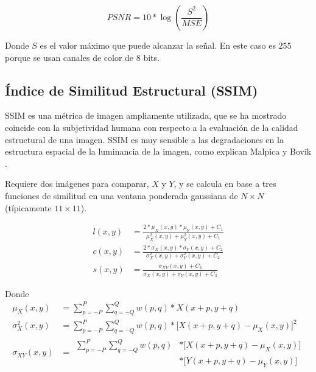 \documentclass[pregrado]{tesis-usb} %
\begin{document}
\begin{equation}\label{eq:psnr}
PSNR=10*\log\left(\frac{S^2}{MSE}\right)
\end{equation}

Donde $S$ es el valor máximo que puede alcanzar la señal. En este caso es $255$ porque se usan canales de color de 8 bits.

\subsection{Índice de Similitud Estructural (SSIM)}
SSIM es una métrica de imagen ampliamente utilizada, que se ha mostrado coincide con la subjetividad humana con respecto a la evaluación de la calidad estructural de una imagen. SSIM es muy sensible a las degradaciones en la estructura espacial de la luminancia de la imagen, como explican Malpica y Bovik \cite{Malpica2009}. 

Requiere dos imágenes para comparar, $X$ y $Y$, y se calcula en base a tres funciones de similitud en una ventana ponderada gaussiana de $N\times N$ (típicamente $11\times 11$).

\begin{equation}\label{eq:ssim_components}
\begin{split}
l(x,y) & = \frac{2*\mu_X(x,y)*\mu_Y(x,y)+C_1}{\mu_X^2(x,y)+\mu_Y^2(x,y)+C_1} \\ 
c(x,y) & = \frac{2*\sigma_X(x,y)*\sigma_Y(x,y)+C_2}{\sigma_X^2(x,y)+\sigma_Y^2(x,y)+C_2} \\ 
s(x,y) & = \frac{\sigma_{XY}(x,y)+C_3}{\sigma_X(x,y)+\sigma_Y(x,y)+C_3}
\end{split}
\end{equation}

Donde
\begin{equation*}
\begin{split}
\mu_X(x,y) & = \sum\limits_{p=-P}^{P} \sum\limits_{q=-Q}^{Q} w(p,q)*X(x+p,y+q)\\ 
\sigma_X^2(x,y) & = \sum\limits_{p=-P}^{P} \sum\limits_{q=-Q}^{Q} w(p,q)*\lbrack X(x+p,y+q)-\mu_X(x,y) \rbrack^2\\ 
\sigma_{XY}(x,y) & = \begin{split}\sum\limits_{p=-P}^{P} \sum\limits_{q=-Q}^{Q} w(p,q)& *\lbrack X(x+p,y+q)-\mu_X(x,y)\rbrack \\ & *\lbrack Y(x+p,y+q)-\mu_Y(x,y)\rbrack\end{split}
\end{split}
\end{equation*}
\end{document}
